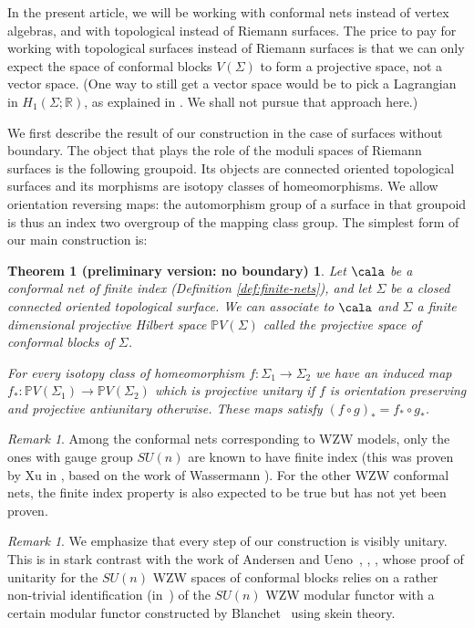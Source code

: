 \documentclass[a4paper,10pt,leqno]{amsart}
\newcommand{\IP}{\mathbb{P}}     \newcommand{\calp}{\mathcal{P}}
\newcommand{\IR}{\mathbb{R}}     \newcommand{\calr}{\mathcal{R}}
\theoremstyle{plain}
\newtheorem*{theorem1*}{Theorem 1 (preliminary version: no boundary)}
\theoremstyle{definition}
\theoremstyle{remark}
\newtheorem{remark}[theorem]{Remark}
\begin{document}
In the present article, we will be working with conformal nets instead of vertex algebras, and with topological instead of Riemann surfaces.
The price to pay for working with topological surfaces instead of Riemann surfaces is that we can only expect the space of conformal blocks $V(\Sigma)$ to form a projective space, not a vector space.
(One way to still get a vector space would be to pick a Lagrangian in $H_1(\Sigma;\IR)$, as explained in \cite{Bakalov-Kirillov(Lect-tens-cat+mod-func)}. We shall not pursue that approach here.)

We first describe the result of our construction in the case of surfaces without boundary.
The object that plays the role of the moduli spaces of Riemann surfaces is the following groupoid.
Its objects are connected oriented topological surfaces and its morphisms are isotopy classes of homeomorphisms.
We allow orientation reversing maps:
the automorphism group of a surface in that groupoid is thus an index two overgroup of the mapping class group.
The simplest form of our main construction is:

\begin{theorem1*}
Let $\cala$ be a conformal net of finite index (Definition \ref{def:finite-nets}), and let $\Sigma$ be a closed connected oriented topological surface.
We can associate to $\cala$ and $\Sigma$ a finite dimensional projective Hilbert space $\IP V(\Sigma)$ called the projective space of conformal blocks of $\Sigma$. 

For every isotopy class of homeomorphism $f:\Sigma_1\to \Sigma_2$ we have an induced map $f_*:\IP V(\Sigma_1)\to \IP V(\Sigma_2)$
which is projective unitary if $f$ is orientation preserving and projective antiunitary otherwise.
These maps satisfy $(f\circ g)_*=f_*\circ g_*$.
\end{theorem1*}

\begin{remark}
Among the conformal nets corresponding to WZW models, only the ones with gauge group $SU(n)$ are known to have finite index
(this was proven by Xu in \cite{Xu(Jones-Wassermann-subfactors)}, based on the work of Wassermann \cite{Wassermann(Operator-algebras-and-conformal-field-theory)}).
For the other WZW conformal nets, the finite index property is also expected to be true but has not yet been proven.
\end{remark}

\begin{remark}
We emphasize that every step of our construction is visibly unitary.
This is in stark contrast with the work of Andersen and Ueno~\cite{Andersen-Ueno(Abelian-CFT+det-bundles)}, \cite{Andersen-Ueno(Geometric-constr-modular-functors)}, \cite{Andersen-Ueno(Reshetikhin-Turaev-from-CFT)}, whose proof of unitarity for the $SU(n)$ WZW spaces of conformal blocks relies on a rather non-trivial identification (in~\cite{Andersen-Ueno(Reshetikhin-Turaev-from-CFT)}) of the $SU(n)$ WZW modular functor with a certain modular functor 
constructed by Blanchet~\cite{Blanchet(Hecke-algebras-modular-categories-and-3-manifolds-quantum-invariants)} using skein theory.
\end{remark}
\end{document}
